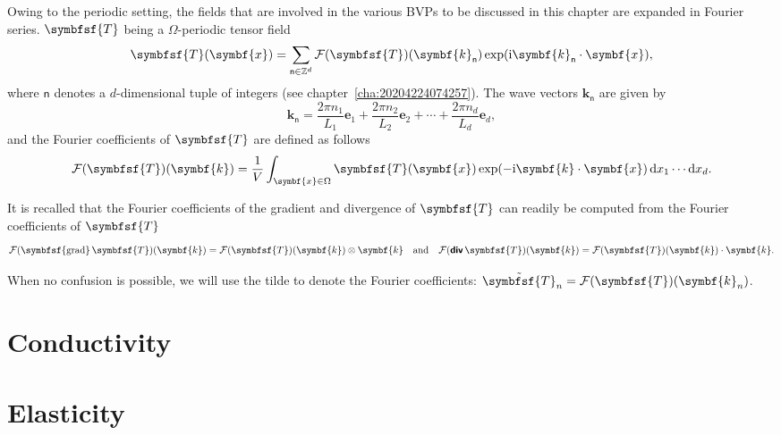 \documentclass[draft, appendixprefix=true, chapterprefix=true, fontsize=12pt, numbers=noendperiod]{scrbook}
\newcommand{\D}{{\mathrm d}}
\newcommand{\I}{\mathrm{i}}
\newcommand{\integers}{\mathbb{Z}}
\DeclareMathOperator{\tdiv}{\textbf{\textsf{div}}}
\DeclareMathOperator{\tgrad}{\symbfsf{grad}}
\newcommand{\tens}[1]{\symbfsf{#1}}
\renewcommand{\vec}[1]{\symbf{#1}}
\newcommand{\tuple}[1]{\mathsf{#1}}
\begin{document}
Owing to the periodic setting, the fields that are involved in the various BVPs
to be discussed in this chapter are expanded in Fourier series. \(\tens T\)
being a \(\Omega\)-periodic tensor field
\begin{equation}
  \tens T(\vec x)=\sum_{\tuple{n}\in\integers^d}\mathcal F(\tens T)(\vec
  k_{\tuple{n}})\exp(\I\vec k_{\tuple{n}}\cdot\vec x),
\end{equation}
where \(\tuple{n}\) denotes a \(d\)-dimensional tuple of integers (see
chapter~\ref{cha:20204224074257}). The wave vectors \(\vec k_{\tuple{n}}\) are
given by
\begin{equation}
  \label{eq:3}
  \vec k_{\tuple{n}}=\frac{2\pi n_1}{L_1}\vec e_1+\frac{2\pi n_2}{L_2}\vec e_2+
  \cdots+\frac{2\pi n_d}{L_d}\vec e_d,
\end{equation}
and the Fourier coefficients of \(\tens T\) are defined as follows
\begin{equation}
  \label{eq:5}
  \mathcal F(\tens T)(\vec k)=\frac1V\int_{\vec x\in\Omega}\tens T(\vec x)
  \exp(-\I\vec k\cdot\vec x)\,\D x_1\cdots\D x_d.
\end{equation}

It is recalled that the Fourier coefficients of the gradient and divergence of
\(\tens T\) can readily be computed from the Fourier coefficients of
\(\tens T\)
\begin{equation}
  \label{eq:4}
  \mathcal F(\tgrad\tens T)(\vec k)=\mathcal F(\tens T)(\vec k)\otimes\vec k
  \quad\text{and}\quad
  \mathcal F(\tdiv\tens T)(\vec k)=\mathcal F(\tens T)(\vec k)\cdot\vec k.
\end{equation}

When no confusion is possible, we will use the tilde to denote the Fourier
coefficients: \(\tilde{\tens T}_n=\mathcal F(\tens T)(\vec k_n)\).

\section{Conductivity}

\section{Elasticity}
\end{document}

